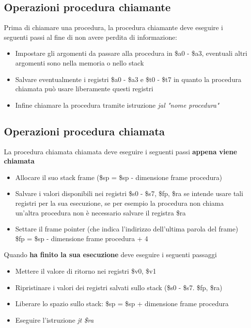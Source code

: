 \documentclass[12pt, a4paper, openany]{book}
\begin{document}
\subsection{Operazioni procedura chiamante}
Prima di chiamare una procedura, la procedura chiamante deve eseguire i seguenti passi
 al fine di non avere perdita di informazione:
\begin{itemize}
    \item Impostare gli argomenti da passare alla procedura in \$a0 - \$a3, eventuali
    altri argomenti sono nella memoria o nello stack
    \item Salvare eventualmente i registri \$a0 - \$a3 e \$t0 - \$t7 in quanto la procedura
    chiamata può usare liberamente questi registri
    \item Infine chiamare la procedura tramite istruzione \textit{jal "nome procedura"}
\end{itemize}

\subsection{Operazioni procedura chiamata}
La procedura chiamata chiamata deve eseguire i seguenti passi \textbf{appena viene chiamata}
\begin{itemize}
    \item Allocare il suo stack frame (\$sp = \$sp - dimensione frame procedura)
    \item Salvare i valori disponibili nei registri \$s0 - \$s7, \$fp, \$ra se intende
    usare tali registri per la sua esecuzione, se per esempio la procedura non chiama
    un'altra procedura non è necessario salvare il registra \$ra
    \item Settare il frame pointer (che indica l'indirizzo dell'ultima parola del frame)
    \$fp = \$sp - dimensione frame procedura + 4
\end{itemize}

Quando \textbf{ha finito la sua esecuzione} deve eseguire i seguenti passaggi
\begin{itemize}
    \item Mettere il valore di ritorno nei registri \$v0, \$v1
    \item Ripristinare i valori dei registri salvati sullo stack (\$s0 - \$s7. \$fp, \$ra)
    \item Liberare lo spazio sullo stack: \$sp = \$sp + dimensione frame procedura
    \item Eseguire l'istruzione \textit{jt \$ra}
\end{itemize}
\end{document}

